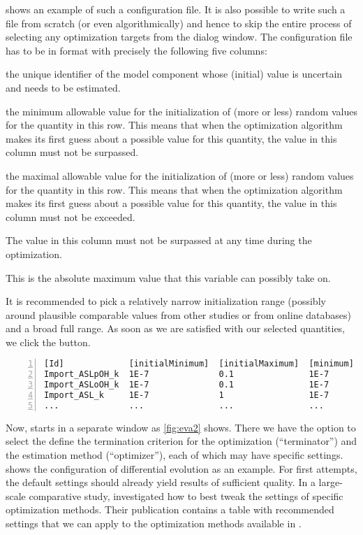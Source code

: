 shows an example of such a configuration file.
It is also possible to write such a file from scratch (or even algorithmically) and hence to skip the entire process of selecting any optimization targets from the dialog window.
The configuration file has to be in \CSV format with precisely the following five columns:
\begin{description}
  \renewcommand{\makelabel}[1]{[\texttt{#1}]}
  \item[Id] the unique identifier of the model component whose (initial) value is uncertain and needs to be estimated.
  \item[initialMinimum] the minimum allowable value for the initialization of (more or less) random values for the quantity in this row.
  This means that when the optimization algorithm makes its first guess about a possible value for this quantity, the value in this column must not be surpassed.
  \item[initialMaximum]  the maximal allowable value for the initialization of (more or less) random values for the quantity in this row.
  This means that when the optimization algorithm makes its first guess about a possible value for this quantity, the value in this column must not be exceeded.
  \item[minimum] The value in this column must not be surpassed at any time during the optimization.
  \item[maximum] This is the absolute maximum value that this variable can possibly take on.
\end{description}
It is recommended to pick a relatively narrow initialization range (possibly around plausible comparable values from other studies or from online databases) and a broad full range.
As soon as we are satisfied with our selected quantities, we click the  button.
\begin{lstlisting}[caption={Input file example for parameter estimation file},label={lst:input:estimation},numbers=left,captionpos=t,float=h]
[Id]             [initialMinimum]  [initialMaximum]  [minimum]  [maximum]
Import_ASLpOH_k  1E-7              0.1               1E-7       0.1	
Import_ASLoOH_k  1E-7              0.1               1E-7       0.1	
Import_ASL_k     1E-7              1                 1E-7       1	
...              ...               ...               ...        ...
\end{lstlisting}

Now, \EvA starts in a separate window as \cref{fig:eva2} shows.
There we have the option to select the define the termination criterion for the optimization (``terminator'') and the estimation method (``optimizer''), each of which may have specific settings.
 shows the configuration of differential evolution \citep{Storn96Usage} as an example.
For first attempts, the default settings should already yield results of sufficient quality.
In a large-scale comparative study, \citet{Draeger2009a} investigated how to best tweak the settings of specific optimization methods.
Their publication contains a table with recommended settings that we can apply to the optimization methods available in \EvA.

